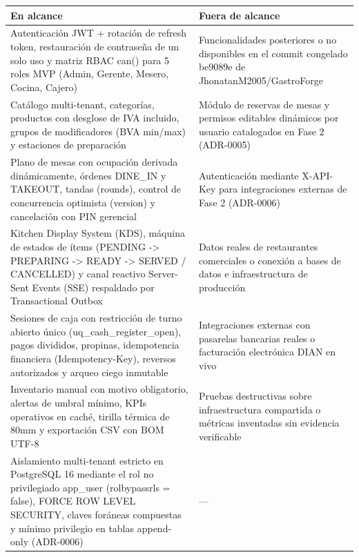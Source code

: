 \documentclass[10pt,a4paper]{article}
\newcounter{none}
\begin{document}
{\def\LTcaptype{none} %
\begin{longtable}[]{@{}
  >{\raggedright\arraybackslash}p{}
  >{\raggedright\arraybackslash}p{}@{}}
\toprule\noalign{}
\begin{minipage}[b]{\linewidth}\raggedright
En alcance
\end{minipage} & \begin{minipage}[b]{\linewidth}\raggedright
Fuera de alcance
\end{minipage} \\
\midrule\noalign{}
\endhead
\bottomrule\noalign{}
\endlastfoot
Autenticación JWT + rotación de refresh token, restauración de contraseña de un solo uso y matriz RBAC can() para 5 roles MVP (Admin, Gerente, Mesero, Cocina, Cajero) & Funcionalidades posteriores o no disponibles en el commit congelado be9089e de JhonatanM2005/GastroForge \\
Catálogo multi-tenant, categorías, productos con desglose de IVA incluido, grupos de modificadores (BVA min/max) y estaciones de preparación & Módulo de reservas de mesas y permisos editables dinámicos por usuario catalogados en Fase 2 (ADR-0005) \\
Plano de mesas con ocupación derivada dinámicamente, órdenes DINE\_IN y TAKEOUT, tandas (rounds), control de concurrencia optimista (version) y cancelación con PIN gerencial & Autenticación mediante X-API-Key para integraciones externas de Fase 2 (ADR-0006) \\
Kitchen Display System (KDS), máquina de estados de ítems (PENDING -\textgreater{} PREPARING -\textgreater{} READY -\textgreater{} SERVED / CANCELLED) y canal reactivo Server-Sent Events (SSE) respaldado por Transactional Outbox & Datos reales de restaurantes comerciales o conexión a bases de datos e infraestructura de producción \\
Sesiones de caja con restricción de turno abierto único (uq\_cash\_register\_open), pagos divididos, propinas, idempotencia financiera (Idempotency-Key), reversos autorizados y arqueo ciego inmutable & Integraciones externas con pasarelas bancarias reales o facturación electrónica DIAN en vivo \\
Inventario manual con motivo obligatorio, alertas de umbral mínimo, KPIs operativos en caché, tirilla térmica de 80mm y exportación CSV con BOM UTF-8 & Pruebas destructivas sobre infraestructura compartida o métricas inventadas sin evidencia verificable \\
Aislamiento multi-tenant estricto en PostgreSQL 16 mediante el rol no privilegiado app\_user (rolbypassrls = false), FORCE ROW LEVEL SECURITY, claves foráneas compuestas y mínimo privilegio en tablas append-only (ADR-0006) & --- \\
\end{longtable}
}
\end{document}
